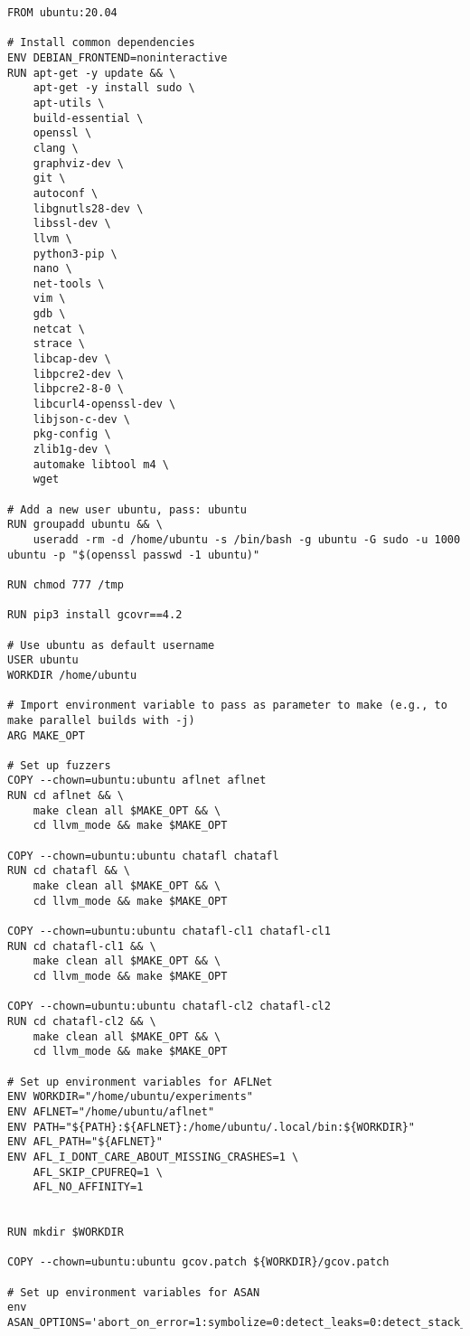 \begin{lstlisting}
FROM ubuntu:20.04

# Install common dependencies
ENV DEBIAN_FRONTEND=noninteractive
RUN apt-get -y update && \
    apt-get -y install sudo \ 
    apt-utils \
    build-essential \
    openssl \
    clang \
    graphviz-dev \
    git \
    autoconf \
    libgnutls28-dev \
    libssl-dev \
    llvm \
    python3-pip \
    nano \
    net-tools \
    vim \
    gdb \
    netcat \
    strace \
    libcap-dev \
    libpcre2-dev \
    libpcre2-8-0 \
    libcurl4-openssl-dev \
    libjson-c-dev \
    pkg-config \
    zlib1g-dev \
    automake libtool m4 \
    wget

# Add a new user ubuntu, pass: ubuntu
RUN groupadd ubuntu && \
    useradd -rm -d /home/ubuntu -s /bin/bash -g ubuntu -G sudo -u 1000 ubuntu -p "$(openssl passwd -1 ubuntu)"

RUN chmod 777 /tmp

RUN pip3 install gcovr==4.2

# Use ubuntu as default username
USER ubuntu
WORKDIR /home/ubuntu

# Import environment variable to pass as parameter to make (e.g., to make parallel builds with -j)
ARG MAKE_OPT

# Set up fuzzers
COPY --chown=ubuntu:ubuntu aflnet aflnet
RUN cd aflnet && \
    make clean all $MAKE_OPT && \
    cd llvm_mode && make $MAKE_OPT

COPY --chown=ubuntu:ubuntu chatafl chatafl
RUN cd chatafl && \
    make clean all $MAKE_OPT && \
    cd llvm_mode && make $MAKE_OPT

COPY --chown=ubuntu:ubuntu chatafl-cl1 chatafl-cl1
RUN cd chatafl-cl1 && \
    make clean all $MAKE_OPT && \
    cd llvm_mode && make $MAKE_OPT

COPY --chown=ubuntu:ubuntu chatafl-cl2 chatafl-cl2
RUN cd chatafl-cl2 && \
    make clean all $MAKE_OPT && \
    cd llvm_mode && make $MAKE_OPT

# Set up environment variables for AFLNet
ENV WORKDIR="/home/ubuntu/experiments"
ENV AFLNET="/home/ubuntu/aflnet"
ENV PATH="${PATH}:${AFLNET}:/home/ubuntu/.local/bin:${WORKDIR}"
ENV AFL_PATH="${AFLNET}"
ENV AFL_I_DONT_CARE_ABOUT_MISSING_CRASHES=1 \
    AFL_SKIP_CPUFREQ=1 \
    AFL_NO_AFFINITY=1


RUN mkdir $WORKDIR

COPY --chown=ubuntu:ubuntu gcov.patch ${WORKDIR}/gcov.patch

# Set up environment variables for ASAN
env ASAN_OPTIONS='abort_on_error=1:symbolize=0:detect_leaks=0:detect_stack_use_after_return=1:detect_container_overflow=0:poison_array_cookie=0:malloc_fill_byte=0:max_malloc_fill_size=16777216'


\end{lstlisting}

